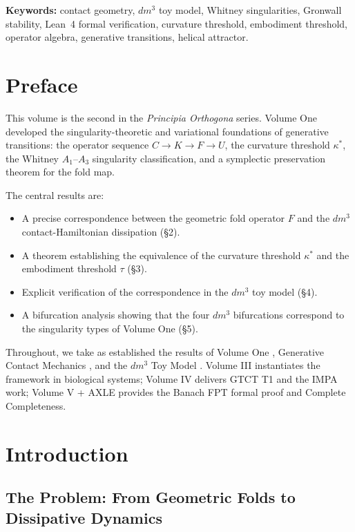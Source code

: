 \documentclass[11pt]{article}
\theoremstyle{boxed}
\begin{document}
\noindent\textbf{Keywords:} contact geometry, $dm^3$ toy model, Whitney
singularities, Gronwall stability, Lean~4 formal verification, curvature
threshold, embodiment threshold, operator algebra, generative transitions,
helical attractor.

\section*{Preface}

This volume is the second in the \emph{Principia Orthogona} series. Volume One
\cite{VolI} developed the singularity-theoretic and variational foundations of
generative transitions: the operator sequence $C \to K \to F \to U$, the
curvature threshold $\kappa^{*}$, the Whitney $A_1$--$A_3$ singularity
classification, and a symplectic preservation theorem for the fold map.

The central results are:
\begin{itemize}[leftmargin=2em]
  \item A precise correspondence between the geometric fold operator $F$ and the $dm^3$ contact-Hamiltonian dissipation (\S 2).
  \item A theorem establishing the equivalence of the curvature threshold $\kappa^{*}$ and the embodiment threshold $\tau$ (\S 3).
  \item Explicit verification of the correspondence in the $dm^3$ toy model (\S 4).
  \item A bifurcation analysis showing that the four $dm^3$ bifurcations correspond to the singularity types of Volume One (\S 5).
\end{itemize}

Throughout, we take as established the results of Volume One \cite{VolI},
Generative Contact Mechanics \cite{GCM}, and the $dm^3$ Toy Model \cite{dm3}.
Volume III instantiates the framework in biological systems; Volume IV delivers
GTCT T1 and the IMPA work; Volume V + AXLE provides the Banach FPT formal proof
and Complete Completeness.

\section{Introduction}

\subsection{The Problem: From Geometric Folds to Dissipative Dynamics}
\end{document}
